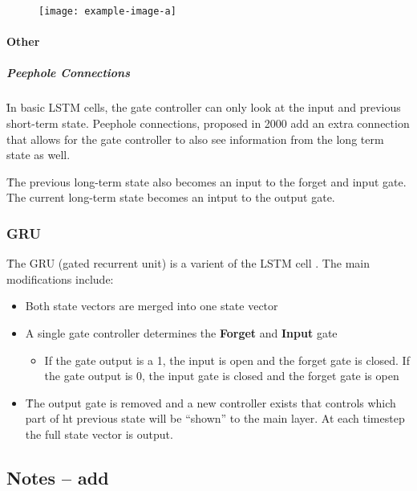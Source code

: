 \begin{figure}
	\centering
	\texttt{[image: example-image-a]}\hfil
	\caption{}
\end{figure}


\paragraph{Other}

\subparagraph{Peephole Connections}

\r{In basic LSTM cells, the gate controller can only look at the input and previous short-term state. Peephole connections, proposed in 2000  add an extra connection that allows for the gate controller to also see information from the long term state as well. }

\r{The previous long-term state also becomes an input to the forget and input gate. The current long-term state becomes an intput to the output gate.}



\subsubsection{GRU}

\r{The GRU (gated recurrent unit) is a varient of the LSTM cell . The main modifications include:}

\begin{itemize}[noitemsep,topsep=0pt]
	\item Both state vectors are merged into one state vector
	\item A single gate controller determines the \textbf{Forget} and \textbf{Input} gate
	\begin{itemize}[noitemsep,topsep=0pt]
		\item If the gate output is a 1, the input is open and the forget gate is closed. If the gate output is 0, the input gate is closed and the forget gate is open
	\end{itemize}
	\item \r{The output gate is removed and a new controller exists that controls which part of ht previous state will be ``shown'' to the main layer}. At each timestep the full state vector is output.
\end{itemize}

\subsection{Notes -- add}

